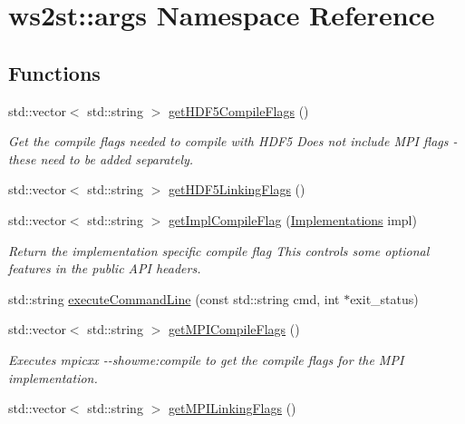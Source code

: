 \hypertarget{namespacews2st_1_1args}{}\section{ws2st\+:\+:args Namespace Reference}
\label{namespacews2st_1_1args}
\subsection*{Functions}
\begin{DoxyCompactItemize}
\item 
std\+::vector$<$ std\+::string $>$ \mbox{\hyperlink{namespacews2st_1_1args_aa88c38554aaf9729dfb17f863bdf4ada}{get\+H\+D\+F5\+Compile\+Flags}} ()
\begin{DoxyCompactList}\small\item\em Get the compile flags needed to compile with H\+D\+F5 Does not include M\+PI flags -\/ these need to be added separately. \end{DoxyCompactList}\item 
std\+::vector$<$ std\+::string $>$ \mbox{\hyperlink{namespacews2st_1_1args_a5eb1ca46c05701cc52a44210093c2eaa}{get\+H\+D\+F5\+Linking\+Flags}} ()
\item 
std\+::vector$<$ std\+::string $>$ \mbox{\hyperlink{namespacews2st_1_1args_a7909fb732055598b38d44b7e2f77aa89}{get\+Impl\+Compile\+Flag}} (\mbox{\hyperlink{common_8hpp_aad9d1428f17c06ff77ef15dea22624dc}{Implementations}} impl)
\begin{DoxyCompactList}\small\item\em Return the implementation specific compile flag This controls some optional features in the public A\+PI headers. \end{DoxyCompactList}\item 
std\+::string \mbox{\hyperlink{namespacews2st_1_1args_a759526679dc8b6662355746dfd34e586}{execute\+Command\+Line}} (const std\+::string cmd, int $\ast$exit\+\_\+status)
\item 
std\+::vector$<$ std\+::string $>$ \mbox{\hyperlink{namespacews2st_1_1args_ae17df12fe1f69d9bb38d427398bc5ce8}{get\+M\+P\+I\+Compile\+Flags}} ()
\begin{DoxyCompactList}\small\item\em Executes {\ttfamily mpicxx -\/-\/showme\+:compile} to get the compile flags for the M\+PI implementation. \end{DoxyCompactList}\item 
std\+::vector$<$ std\+::string $>$ \mbox{\hyperlink{namespacews2st_1_1args_af89364224123958495fbf930ea918e7e}{get\+M\+P\+I\+Linking\+Flags}} ()

\end{DoxyCompactItemize}

